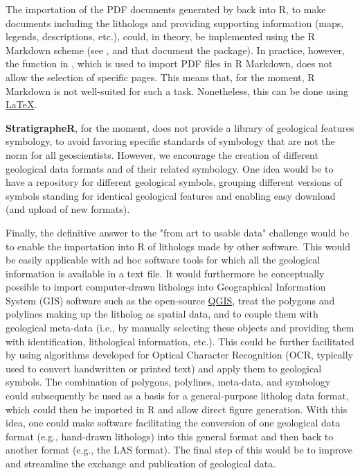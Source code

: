 The importation of the PDF documents generated by  back into R, to make documents including the lithologs and providing supporting information (maps, legends, descriptions, etc.), could, in theory, be implemented using the R Markdown scheme (see \citet{xie_r_2018}, \citet{xie_r_2020} and \citet{allaire_rmarkdown_2021} that document the  package). In practice, however, the  function in  \citep{xie_knitr_2020}, which is used to import PDF files in R Markdown, does not allow the selection of specific pages. This means that, for the moment, R Markdown is not well-suited for such a task. Nonetheless, this can be done using \href{https://www.latex-project.org/}{LaTeX}.

\textbf{StratigrapheR}, for the moment, does not provide a library of geological features symbology, to avoid favoring specific standards of symbology that are not the norm for all geoscientists. However, we encourage the creation of different geological data formats and of their related symbology. One idea would be to have a repository for different geological symbols, grouping different versions of symbols standing for identical geological features and enabling easy download (and upload of new formats). 

Finally, the definitive answer to the "from art to usable data" challenge would be to enable the importation into R of lithologs made by other software. This would be easily applicable with ad hoc software tools for which all the geological information is available in a text file. It would furthermore be conceptually possible to import computer-drawn lithologs into Geographical Information System (GIS) software such as the open-source \href{https://www.qgis.org/en/site/}{QGIS}, treat the polygons and polylines making up the litholog as spatial data, and to couple them with geological meta-data (i.e., by manually selecting these objects and providing them with identification, lithological information, etc.). This could be further facilitated by using algorithms developed for Optical Character Recognition (OCR, typically used to convert handwritten or printed text) and apply them to geological symbols. The combination of polygons, polylines, meta-data, and symbology could subsequently be used as a basis for a general-purpose litholog data format, which could then be imported in R and allow direct figure generation. With this idea, one could make software facilitating the conversion of one geological data format (e.g., hand-drawn lithologs) into this general format and then back to another format (e.g., the LAS format). The final step of this would be to improve and streamline the exchange and publication of geological data.

